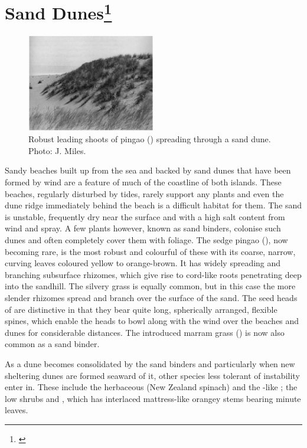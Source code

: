 \section[Sand Dunes]{Sand Dunes\footnote{\cite{moore1963plants}}}

\begin{figure}
	\includegraphics[width=0.5\textwidth]{graphics/figure88pingao.jpg}
	\centering
	\caption[Robust leading shoots of pingao]{Robust leading shoots of pingao () spreading through a sand dune.
	Photo: J. Miles.}%
	\label{fig:88pingao}
\end{figure}

Sandy beaches built up from the sea and backed by sand dunes that have been formed by wind are a feature of much of the coastline of both islands.
These beaches, regularly disturbed by tides, rarely support any plants and even the dune ridge immediately behind the beach is a difficult habitat for them.
The sand is unstable, frequently dry near the surface and with a high salt content from wind and spray.
A few plants however, known as sand binders, colonise such dunes and often completely cover them with foliage.
The sedge pingao (), now becoming rare, is the most robust and colourful of these with its coarse, narrow, curving leaves coloured yellow to orange-brown.
It has widely spreading and branching subsurface rhizomes, which give rise to cord-like roots penetrating deep into the sandhill.
The silvery grass  is equally common, but in this case the more slender rhizomes spread and branch over the surface of the sand.
The seed heads of  are distinctive in that they bear quite long, spherically arranged, flexible spines, which enable the heads to bowl along with the wind over the beaches and dunes for considerable distances.
The introduced marram grass () is now also common as a sand binder.

As a dune becomes consolidated by the sand binders and particularly when new sheltering dunes are formed seaward of it, other species less tolerant of instability enter in.
These include the herbaceous  (New Zealand spinach) and the -like ; the low shrubs  and , which has interlaced mattress-like orangey stems bearing minute leaves.

